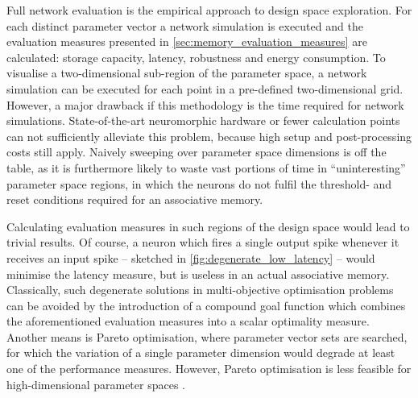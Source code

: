 Full network evaluation is the empirical approach to design space exploration. For each distinct parameter vector a network simulation is executed and the evaluation measures presented in \cref{sec:memory_evaluation_measures} are calculated: storage capacity, latency, robustness and energy consumption. To visualise a two-dimensional sub-region of the parameter space, a network simulation can be executed for each point in a pre-defined two-dimensional grid. However, a major drawback if this methodology is the time required for network simulations. State-of-the-art neuromorphic hardware or fewer calculation points can not sufficiently alleviate this problem, because high setup and post-processing costs still apply. Naively sweeping over parameter space dimensions is off the table, as it is furthermore likely to waste vast portions of time in \enquote{uninteresting} parameter space regions, in which the neurons do not fulfil the threshold- and reset conditions required for an associative memory.

{\label{fig:degenerate_low_latency}}
Calculating evaluation measures in such regions of the design space would lead to trivial results. Of course, a neuron which fires a single output spike whenever it receives an input spike -- sketched in \cref{fig:degenerate_low_latency} -- would minimise the latency measure, but is useless in an actual associative memory. Classically, such degenerate solutions in multi-objective optimisation problems can be avoided by the introduction of a compound goal function which combines the aforementioned evaluation measures into a scalar optimality measure. Another means is Pareto optimisation, where parameter vector sets are searched, for which the variation of a single parameter dimension would degrade at least one of the performance measures. However, Pareto optimisation is less feasible for high-dimensional parameter spaces \cite{miettinen2012nonlinear}.

